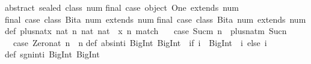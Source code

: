 \begin{isabellebody}
\begin{isamarkuptext}
\isanewline
abstract\ sealed\ class\ num\isanewline
final\ case\ object\ One\ extends\ num\isanewline
final\ case\ class\ Bit{}{}a{}\ num{}\ extends\ num\isanewline
final\ case\ class\ Bit{}{}a{}\ num{}\ extends\ num\isanewline
\isanewline
def\ plus{}nat{}x{}{}\ nat{}\ n{}\ nat{}{}\ nat\ {}\ {}x{}{}\ n{}\ match\ {}\isanewline
\ \ case\ {}Suc{}m{}{}\ n{}\ {}{}\ plus{}nat{}m{}\ Suc{}n{}{}\isanewline
\ \ case\ {}Zero{}nat{}\ n{}\ {}{}\ n\isanewline
{}\isanewline
\isanewline
def\ abs{}int{}i{}\ BigInt{}{}\ BigInt\ {}\ {}if\ {}i\ {}\ BigInt{}{}{}{}\ {}{}\ i{}\ else\ i{}\isanewline
\isanewline
def\ sgn{}int{}i{}\ BigInt{}{}\ BigInt\ {}\isanewline

\end{isamarkuptext}
\end{isabellebody}
